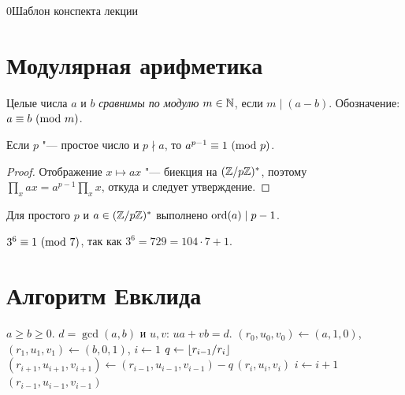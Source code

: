 \begin{lecture}{0}{Шаблон конспекта лекции}

\section{Модулярная арифметика}

\begin{definition}
Целые числа $a$ и $b$ \emph{сравнимы по модулю} $m \in \mathbb{N}$, если $m \mid (a - b)$.
Обозначение: $a \equiv b\ (\mathrm{mod}\ m)$.
\end{definition}

\begin{theorem}\label{l0:fermat}
Если $p$ "--- простое число и $p \nmid a$, то $a^{p-1} \equiv 1\ (\mathrm{mod}\ p)$.
\end{theorem}

\begin{proof}
Отображение $x \mapsto ax$ "--- биекция на $(\mathbb{Z}/p\mathbb{Z})^{*}$, поэтому
$\prod_{x} ax = a^{p-1} \prod_{x} x$, откуда и следует утверждение.
\end{proof}

\begin{corollary}
Для простого $p$ и $a \in (\mathbb{Z}/p\mathbb{Z})^{*}$ выполнено $\operatorname{ord}(a) \mid p - 1$.
\end{corollary}


\begin{example}
$3^{6} \equiv 1\ (\mathrm{mod}\ 7)$, так как $3^6 = 729 = 104 \cdot 7 + 1$.
\end{example}

\section{Алгоритм Евклида}

\begin{algorithm}
\begin{algorithmic}[1]
\Require $a \ge b \ge 0$.
\Ensure $d = \gcd(a, b)$ и $u, v$: $ua + vb = d$.
\State $(r_0, u_0, v_0) \gets (a, 1, 0)$, $(r_1, u_1, v_1) \gets (b, 0, 1)$, $i \gets 1$
  \State $q \gets \lfloor r_{i-1} / r_i\rfloor$
  \State $(r_{i+1}, u_{i+1}, v_{i+1}) \gets (r_{i-1}, u_{i-1}, v_{i-1}) - q\,(r_i, u_i, v_i)$
  \State $i \gets i + 1$
\EndWhile
\State \Return $(r_{i-1}, u_{i-1}, v_{i-1})$
\end{algorithmic}
\end{algorithm}


\end{lecture}
